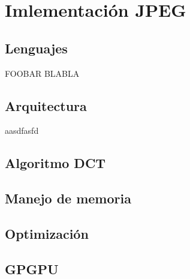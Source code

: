 

\chapter{Imlementación JPEG}\label{ch:implementacion}

\section{Lenguajes}

FOOBAR BLABLA

\section{Arquitectura}

aasdfasfd

\section{Algoritmo DCT}


\section{Manejo de memoria}

\section{Optimización}

\section{GPGPU}
